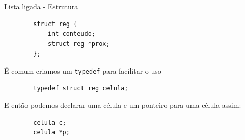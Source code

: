 \documentclass{beamer}
\newcommand{\cod}[1]{\texttt{#1}}
\begin{document}
\begin{frame}[fragile]{Lista ligada - Estrutura}

    \begin{verbatim}
        struct reg {
            int conteudo;
            struct reg *prox;
        };
    \end{verbatim}

    \begin{center}
    \end{center}

    É comum criamos um \cod{typedef} para facilitar o uso
    \vspace{-1em}
    \begin{verbatim}
        typedef struct reg celula;
    \end{verbatim}

    E então podemos declarar uma célula e um ponteiro para uma célula assim:
    \vspace{-1em}
    \begin{verbatim}
        celula c;
        celula *p;
    \end{verbatim}

\end{frame}
\end{document}
